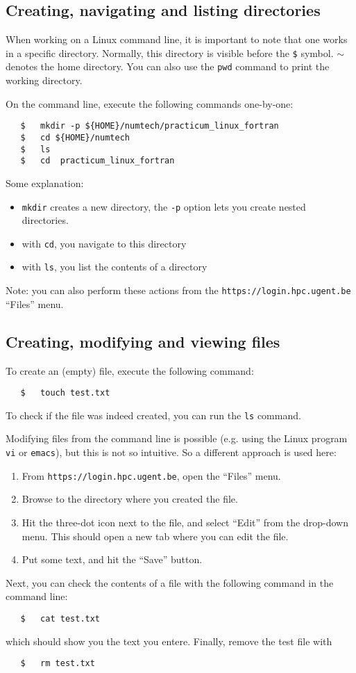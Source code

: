 \documentclass[a4paper]{article}
\begin{document}
\subsection{Creating, navigating and listing directories}
%
\par
When working on a Linux command line, it is important to note that one works in a specific directory. Normally, this directory is visible before the \texttt{\$} symbol. $\sim$ denotes the home directory. You can also use the \verb+pwd+ command to print the working directory.
%
\par
On the command line, execute the following commands one-by-one:
%
\begin{verbatim}
   $   mkdir -p ${HOME}/numtech/practicum_linux_fortran
   $   cd ${HOME}/numtech
   $   ls
   $   cd  practicum_linux_fortran
\end{verbatim}
%
Some explanation:
%
\begin{itemize}
	\item \texttt{mkdir} creates a new directory, the \texttt{-p} option lets you create nested directories.
	\item with \texttt{cd}, you navigate to this directory
	\item with \texttt{ls}, you list the contents of a directory
\end{itemize}
%
Note: you can also perform these actions from the \texttt{https://login.hpc.ugent.be} ``Files'' menu. 
%
\subsection{Creating, modifying and viewing files}
%
\par
To create an (empty) file, execute the following command:
%
\begin{verbatim}
   $   touch test.txt
\end{verbatim}
%
To check if the file was indeed created, you can run the \texttt{ls} command.
%
\par
Modifying files from the command line is possible (e.g. using the Linux program \texttt{vi} or \texttt{emacs}), but this is not so intuitive. So a different approach is used here:
\begin{enumerate}
	\item From \texttt{https://login.hpc.ugent.be}, open the ``Files'' menu.
	\item Browse to the directory where you created the file.
	\item Hit the three-dot icon next to the file, and select ``Edit'' from the drop-down menu. This should open a new tab where you can edit the file.
	\item Put some text, and hit the ``Save'' button.
\end{enumerate}
%
\par
Next, you can check the contents of a file with the following command in the command line:
%
\begin{verbatim}
   $   cat test.txt
\end{verbatim}
%
which should show you the text you entere. Finally, remove the test file with 
%
\begin{verbatim}
   $   rm test.txt
\end{verbatim}
%
\end{document}
